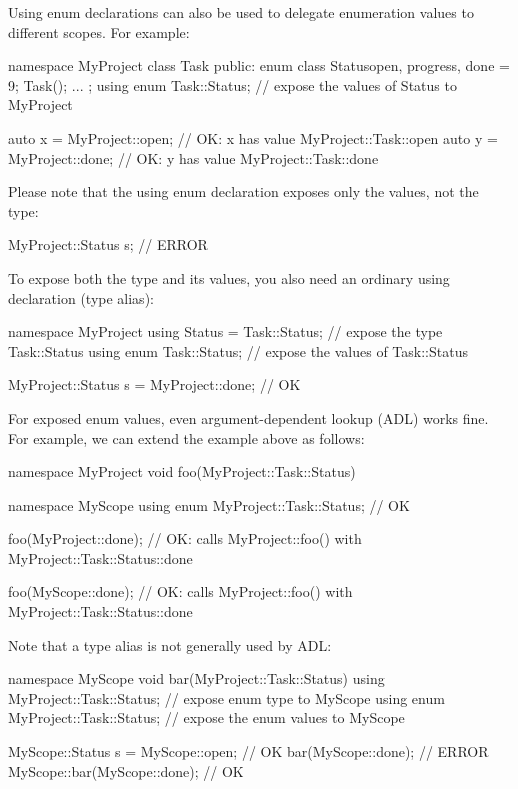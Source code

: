Using enum declarations can also be used to delegate enumeration values to different scopes. For example:

\begin{cpp}
namespace MyProject {
	class Task {
		public:
		enum class Status{open, progress, done = 9};
		Task();
		...
	};
	using enum Task::Status; // expose the values of Status to MyProject
}

auto x = MyProject::open; // OK: x has value MyProject::Task::open
auto y = MyProject::done; // OK: y has value MyProject::Task::done
\end{cpp}

Please note that the using enum declaration exposes only the values, not the type:

\begin{cpp}
MyProject::Status s; // ERROR
\end{cpp}

To expose both the type and its values, you also need an ordinary using declaration (type alias):

\begin{cpp}
namespace MyProject {
	using Status = Task::Status; // expose the type Task::Status
	using enum Task::Status; // expose the values of Task::Status
}

MyProject::Status s = MyProject::done; // OK
\end{cpp}

For exposed enum values, even argument-dependent lookup (ADL) works fine. For example, we can extend the example above as follows:

\begin{cpp}
namespace MyProject {
	void foo(MyProject::Task::Status) {
	}
}

namespace MyScope {
	using enum MyProject::Task::Status; // OK
}

foo(MyProject::done); // OK: calls MyProject::foo() with MyProject::Task::Status::done

foo(MyScope::done); // OK: calls MyProject::foo() with MyProject::Task::Status::done
\end{cpp}

Note that a type alias is not generally used by ADL:

\begin{cpp}
namespace MyScope {
	void bar(MyProject::Task::Status) {
	}
	using MyProject::Task::Status; // expose enum type to MyScope
	using enum MyProject::Task::Status; // expose the enum values to MyScope
}

MyScope::Status s = MyScope::open; // OK
bar(MyScope::done); // ERROR
MyScope::bar(MyScope::done); // OK
\end{cpp}




